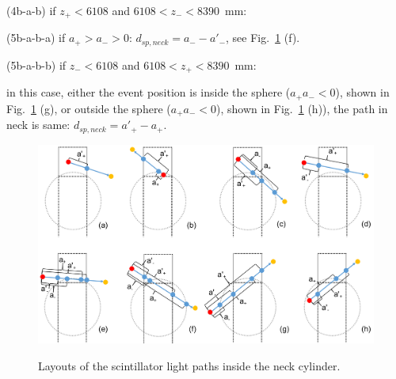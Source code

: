 \begin{algorithm}
	\hspace{10mm}(4b-a-b) if $z_+<6108$ and $6108<z_-<8390$~mm:
	
	\hspace{12mm}(5b-a-b-a) if $a_+>a_->0$: $d_{sp,neck}=a_--a'_-$, see Fig.~\ref{lightpath_scintNeck} (f).
	
	\hspace{12mm}(5b-a-b-b) if $z_-<6108$ and $6108<z_+<8390$~mm:
	
	\hspace{14mm}in this case, either the event position is inside the sphere ($a_+a_-<0$), shown in Fig.~\ref{lightpath_scintNeck} (g), or outside the sphere ($a_+a_-<0$), shown in Fig.~\ref{lightpath_scintNeck} (h)), the path in neck is same: $d_{sp,neck}=a'_+ - a_+$.
\end{algorithm}


\begin{figure}
	\centering
	{\includegraphics[width=130mm]{scintpathNeck.png}}
	\caption{Layouts of the scintillator light paths inside the neck cylinder.\label{lightpath_scintNeck}}
\end{figure}

